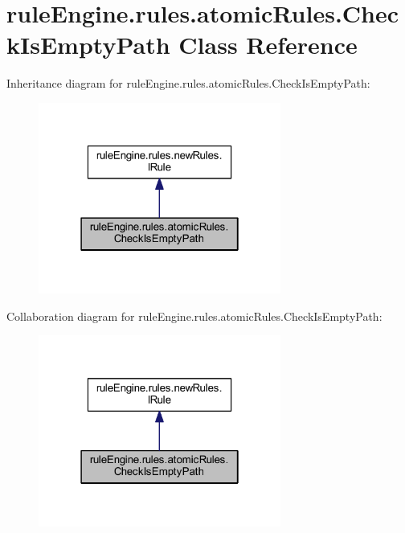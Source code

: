 \hypertarget{classrule_engine_1_1rules_1_1atomic_rules_1_1_check_is_empty_path}{}\section{rule\+Engine.\+rules.\+atomic\+Rules.\+Check\+Is\+Empty\+Path Class Reference}
\label{classrule_engine_1_1rules_1_1atomic_rules_1_1_check_is_empty_path}


Inheritance diagram for rule\+Engine.\+rules.\+atomic\+Rules.\+Check\+Is\+Empty\+Path\+:
\nopagebreak
\begin{figure}[H]
\begin{center}
\leavevmode
\includegraphics[width=226pt]{classrule_engine_1_1rules_1_1atomic_rules_1_1_check_is_empty_path__inherit__graph}
\end{center}
\end{figure}


Collaboration diagram for rule\+Engine.\+rules.\+atomic\+Rules.\+Check\+Is\+Empty\+Path\+:
\nopagebreak
\begin{figure}[H]
\begin{center}
\leavevmode
\includegraphics[width=226pt]{classrule_engine_1_1rules_1_1atomic_rules_1_1_check_is_empty_path__coll__graph}
\end{center}
\end{figure}
